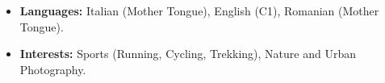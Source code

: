 
{

  \vspace{0.5em}

  \begin{itemize}
    \item \textbf{Languages:} Italian (Mother Tongue), English (C1), Romanian (Mother Tongue).
    \item \textbf{Interests:} Sports (Running, Cycling, Trekking), Nature and Urban Photography.
  \end{itemize}
}

